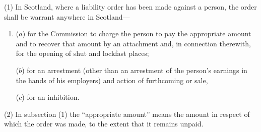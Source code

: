 \documentclass[12pt,a4paper]{article}
\begin{document}
(1) In Scotland, where a liability order has been made against a person, the order shall be warrant anywhere in Scotland—
\begin{enumerate}\item[]
($a$) for the 
Commission  %
to charge the person to pay the appropriate amount and to recover that amount by 
an attachment  %
and, in connection therewith, for the opening of shut and lockfast places;

%

($b$) for an arrestment (other than an arrestment of the person’s earnings in the hands of his employers) and action of furthcoming or sale,

($c$) for an inhibition.
\end{enumerate}

(2) In subsection (1)  the “appropriate amount” means the amount in respect of which the order was made, to the extent that it remains unpaid.

%
\end{document}
